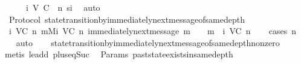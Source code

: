 \begin{isabellebody}
\ \ \ \ {\isacartoucheopen}{\isasymsigma}\ {\isasymin}\ {\isasymSigma}i\ {\isacharparenleft}V{\isacharcomma}\ C{\isacharcomma}\ {\isasymepsilon}{\isacharparenright}\ n{\isacartoucheclose}\ si\ \isamarkupfalse%
\ auto\isanewline
{}\isamarkupfalse%
%
\endisatagproof
{\isafoldproof}%
%
\isadelimproof
\isanewline
%
\endisadelimproof
\isanewline
{}\isamarkupfalse%
\ {\isacharparenleft}\ Protocol{\isacharparenright}\ state{\isacharunderscore}transition{\isacharunderscore}by{\isacharunderscore}immediately{\isacharunderscore}next{\isacharunderscore}message{\isacharunderscore}of{\isacharunderscore}same{\isacharunderscore}depth{\isacharcolon}\ \isanewline
\ \ {\isachardoublequoteopen}{\isasymforall}{\isasymsigma}{\isasymin}{\isasymSigma}i\ {\isacharparenleft}V{\isacharcomma}C{\isacharcomma}{\isasymepsilon}{\isacharparenright}\ n{\isachardot}\ {\isasymforall}m{\isasymin}Mi\ {\isacharparenleft}V{\isacharcomma}C{\isacharcomma}{\isasymepsilon}{\isacharparenright}\ n{\isachardot}\ immediately{\isacharunderscore}next{\isacharunderscore}message\ {\isacharparenleft}{\isasymsigma}{\isacharcomma}m{\isacharparenright}\ {\isasymlongrightarrow}\ {\isasymsigma}\ {\isasymunion}\ {\isacharbraceleft}m{\isacharbraceright}\ {\isasymin}\ {\isasymSigma}i\ {\isacharparenleft}V{\isacharcomma}C{\isacharcomma}{\isasymepsilon}{\isacharparenright}\ {\isacharparenleft}n{\isacharplus}{}{\isacharparenright}{\isachardoublequoteclose}\isanewline
%
\isadelimproof
\ \ %
\endisadelimproof
%
\isatagproof
{}\isamarkupfalse%
\ {\isacharparenleft}cases\ n{\isacharparenright}\isanewline
\ \ \isamarkupfalse%
\ auto{\isacharbrackleft}{}{\isacharbrackright}\isanewline
\ \ \isamarkupfalse%
\ state{\isacharunderscore}transition{\isacharunderscore}by{\isacharunderscore}immediately{\isacharunderscore}next{\isacharunderscore}message{\isacharunderscore}of{\isacharunderscore}same{\isacharunderscore}depth{\isacharunderscore}non{\isacharunderscore}zero\isanewline
\ \ \isamarkupfalse%
\ {\isacharparenleft}metis\ le{\isacharunderscore}add{}\ plus{\isacharunderscore}{}{\isacharunderscore}eq{\isacharunderscore}Suc{\isacharparenright}%
\endisatagproof
{\isafoldproof}%
%
\isadelimproof
\isanewline
%
\endisadelimproof
\isanewline
{}\isamarkupfalse%
\ {\isacharparenleft}\ Params{\isacharparenright}\ past{\isacharunderscore}state{\isacharunderscore}exists{\isacharunderscore}in{\isacharunderscore}same{\isacharunderscore}depth\ {\isacharcolon}\isanewline

\end{isabellebody}
